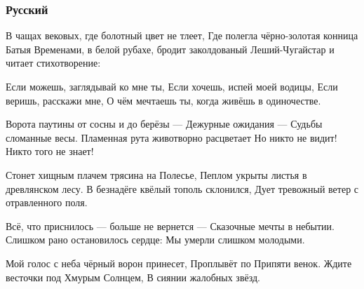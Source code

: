  
 

\subsubsection{Русский}

В чащах вековых, где болотный цвет не тлеет,
Где полегла чёрно-золотая конница Батыя
Временами, в белой рубахе, бродит заколдованый
Леший-Чугайстар и читает стихотворение:

Если можешь, заглядывай ко мне ты,
Если хочешь, испей моей водицы,
Если веришь, расскажи мне,
О чём мечтаешь ты, когда живёшь в одиночестве.

Ворота паутины от сосны и до берёзы —
Дежурные ожидания — Судьбы сломанные весы.
Пламенная рута животворно расцветает
Но никто не видит! Никто того не знает!

Стонет хищным плачем трясина на Полесье,
Пеплом укрыты листья в древлянском лесу.
В безнадёге квёлый тополь склонился,
Дует тревожный ветер с отравленного поля.

Всё, что приснилось — больше не вернется —
Сказочные мечты в небытии.
Слишком рано остановилось сердце:
Мы умерли слишком молодыми.

Мой голос с неба чёрный ворон принесет,
Проплывёт по Припяти венок.
Ждите весточки под Хмурым Солнцем,
В сиянии жалобных звёзд.
